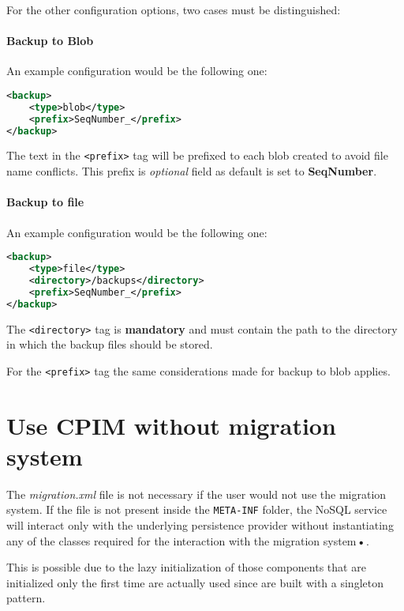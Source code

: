 \newparagraph For the other configuration options, two cases must be distinguished:

\paragraph{Backup to Blob} An example configuration would be the following one:
\begin{lstlisting}[language=XML, caption=Backup to blob]
<backup>
    <type>blob</type>
    <prefix>SeqNumber_</prefix>
</backup>
\end{lstlisting}

\noindent The text in the \texttt{<prefix>} tag will be prefixed to each blob created to avoid file name conflicts.
This prefix is  \textit{optional} field as default is set to \textbf{SeqNumber\textunderscore}.

\paragraph{Backup to file} An example configuration would be the following one:
\begin{lstlisting}[language=XML, caption=Backup to file]
<backup>
    <type>file</type>
    <directory>/backups</directory>
    <prefix>SeqNumber_</prefix>
</backup>
\end{lstlisting}

\noindent The \texttt{<directory>} tag is \textbf{mandatory} and must contain the path to the directory in which the backup files should be stored.

\noindent For the \texttt{<prefix>} tag the same considerations made for backup to blob applies.

\section{Use CPIM without migration system}
The \textit{migration.xml} file is not necessary if the user would not use the migration system. If the file is not present inside the \texttt{META-INF} folder, the NoSQL service will interact only with the underlying persistence provider without instantiating any of the classes required for the interaction with the migration system\textbf{•}.

\noindent This is possible due to the lazy initialization of those components that are initialized only the first time are actually used since are built with a singleton pattern.